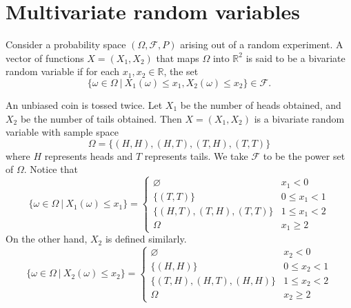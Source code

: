 \chapter{Multivariate random variables}

\begin{definition}
    Consider a probability space $(\Omega, \mathcal{F}, P)$ arising out of a 
    random experiment. A vector of functions $X = (X_1, X_2)$ that maps 
    $\Omega$ into $\mathbb{R}^2$ is said to be a bivariate random variable if for each $x_1, x_2 \in \mathbb{R}$, the set
    \begin{equation}
        \{ \omega \in \Omega \> | \> X_1(\omega) \leq x_1, X_2(\omega) \leq x_2 \} \in \mathcal{F}.
    \end{equation}
\end{definition}

\begin{example}
    An unbiased coin is tossed twice. Let $X_1$ be the number of heads obtained, and $X_2$ be the number of tails obtained. Then $X = (X_1, X_2)$ is a bivariate random variable 
    with sample space 
    \[
        \Omega = \{ (H,H), (H,T), (T,H), (T,T) \}
    \]
    where $H$ represents heads and $T$ represents tails. We take $\mathcal{F}$ to be the power set of $\Omega$.
    Notice that 
    \[
        \{ \omega \in \Omega \> | \> X_1(\omega) \leq x_1 \} = \begin{cases}
            \varnothing & x_1 < 0\\
            \{ (T,T) \} & 0 \leq x_1 < 1\\
            \{ (H,T), (T,H), (T,T) \} & 1 \leq x_1 < 2\\
            \Omega & x_1 \geq 2
        \end{cases}
    \]
    On the other hand, $X_2$ is defined similarly.
    \[
        \{ \omega \in \Omega \> | \> X_2(\omega) \leq x_2 \} = \begin{cases}
            \varnothing & x_2 < 0\\
            \{ (H,H) \} & 0 \leq x_2 < 1\\
            \{ (T,H), (H,T), (H,H) \} & 1 \leq x_2 < 2\\
            \Omega & x_2 \geq 2
        \end{cases}
    \]
\end{example}

